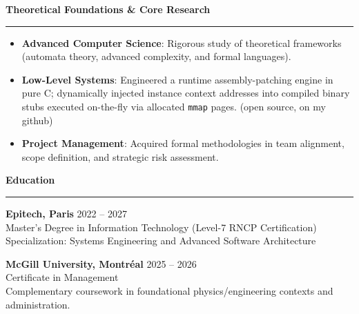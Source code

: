 \documentclass[9pt]{extarticle}
\begin{document}
{\large\bfseries Theoretical Foundations \& Core Research}
\par\vspace{-8pt}
\rule{\linewidth}{0.4pt}
\par\vspace{5pt}
\begin{itemize}[noitemsep, topsep=0pt]
    \item {\bfseries Advanced Computer Science}: Rigorous study of theoretical frameworks (automata theory, advanced complexity, and formal languages).
    \item {\bfseries Low-Level Systems}: Engineered a runtime assembly-patching engine in pure C; dynamically injected instance context addresses into compiled binary stubs executed on-the-fly via allocated \texttt{mmap} pages. (open source, on my github)
    \item {\bfseries Project Management}: Acquired formal methodologies in team alignment, scope definition, and strategic risk assessment.
\end{itemize}
\par\vspace{8pt}

{\large\bfseries Education}
\par\vspace{-8pt}
\rule{\linewidth}{0.4pt}
\par\vspace{5pt}

{\bfseries Epitech, Paris} \hfill 2022 -- 2027 \\
Master's Degree in Information Technology (Level-7 RNCP Certification) \\
Specialization: Systems Engineering and Advanced Software Architecture

\vspace{6pt}

{\bfseries McGill University, Montréal} \hfill 2025 -- 2026 \\
Certificate in Management \\
Complementary coursework in foundational physics/engineering contexts and administration.
\end{document}
